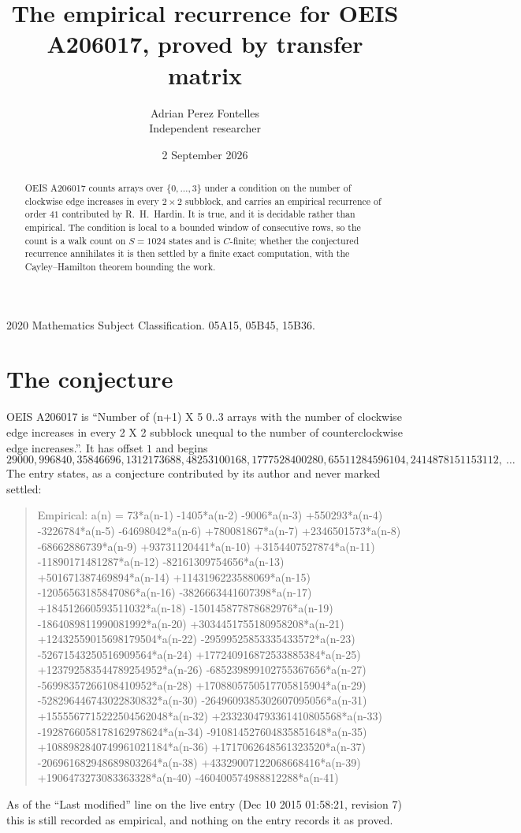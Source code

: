 \documentclass[11pt,a4paper]{article}
\title{The empirical recurrence for OEIS A206017, proved by transfer matrix}
\author{Adrian Perez Fontelles\\ \small Independent researcher}
\date{2 September 2026}
\theoremstyle{plain}
\theoremstyle{definition}
\begin{document}
\maketitle

\begin{abstract}
OEIS A206017 counts arrays over $\{0,\dots,3\}$ under a condition on the number of clockwise edge increases
in every $2\times2$ subblock, and carries an empirical recurrence of order $41$ contributed by
R.~H.~Hardin. It is true, and it is decidable rather than empirical. The condition is local to
a bounded window of consecutive rows, so the count is a walk count on $S=1024$ states and is
$C$-finite; whether the conjectured recurrence annihilates it is then settled by a finite exact
computation, with the Cayley--Hamilton theorem bounding the work.
\end{abstract}

\noindent\small 2020 Mathematics Subject Classification. 05A15, 05B45, 15B36.\normalsize

\section{The conjecture}

OEIS A206017 is ``Number of (n+1) X 5 0..3 arrays with the number of clockwise edge increases in every 2 X 2 subblock unequal to the number of counterclockwise edge increases.''. It has offset $1$ and begins
\[
29000, 996840, 35846696, 1312173688, 48253100168, 1777528400280, 65511284596104, 2414878151153112,\ \dots
\]
The entry states, as a conjecture contributed by its author and never marked settled:
\begin{quote}
Empirical: a(n) = 73*a(n-1) -1405*a(n-2) -9006*a(n-3) +550293*a(n-4) -3226784*a(n-5) -64698042*a(n-6) +780081867*a(n-7) +2346501573*a(n-8) -68662886739*a(n-9) +93731120441*a(n-10) +3154407527874*a(n-11) -11890171481287*a(n-12) -82161309754656*a(n-13) +501671387469894*a(n-14) +1143196223588069*a(n-15) -12056563185847086*a(n-16) -3826663441607398*a(n-17) +184512660593511032*a(n-18) -150145877878682976*a(n-19) -1864089811990081992*a(n-20) +3034451755180958208*a(n-21) +12432559015698179504*a(n-22) -29599525853335433572*a(n-23) -52671543250516909564*a(n-24) +177240916872533885384*a(n-25) +123792583544789254952*a(n-26) -685239899102755367656*a(n-27) -56998357266108410952*a(n-28) +1708805750517705815904*a(n-29) -528296446743022830832*a(n-30) -2649609385302607095056*a(n-31) +1555567715222504562048*a(n-32) +2332304793361410805568*a(n-33) -1928766058178162978624*a(n-34) -910814527604835851648*a(n-35) +1088982840749961021184*a(n-36) +1717062648561323520*a(n-37) -206961682948689803264*a(n-38) +43329007122068668416*a(n-39) +1906473273083363328*a(n-40) -460400574988812288*a(n-41)
\end{quote}
As of the ``Last modified'' line on the live entry (Dec 10 2015 01:58:21, revision 7) this is still
recorded as empirical, and nothing on the entry records it as proved.
\end{document}
